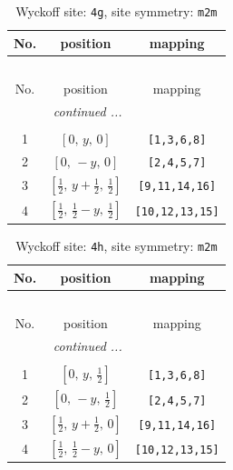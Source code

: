 \documentclass[fleqn,8pt]{jsarticle}
\begin{document}
\renewcommand{\arraystretch}{1.2}
\begin{longtable}{ccc}
\caption{Wyckoff site: {\tt 4g}, site symmetry: {\tt m2m}}
 \\
 \hline \hline
No. & position & mapping \\ \hline \endfirsthead

\multicolumn{2}{l}{\tablename\ \thetable{}} \\
 \hline \hline
No. & position & mapping \\ \hline \endhead

 \hline \hline
\multicolumn{2}{r}{\footnotesize\it continued ...} \\ \endfoot

 \hline \hline
\multicolumn{2}{r}{} \\ \endlastfoot

1 & $\left[ 0,\, y,\, 0 \right]$ & {\tt [1,3,6,8]} \\ \hline
2 & $\left[ 0,\, - y,\, 0 \right]$ & {\tt [2,4,5,7]} \\ \hline
3 & $\left[ \frac{1}{2},\, y + \frac{1}{2},\, \frac{1}{2} \right]$ & {\tt [9,11,14,16]} \\ \hline
4 & $\left[ \frac{1}{2},\, \frac{1}{2} - y,\, \frac{1}{2} \right]$ & {\tt [10,12,13,15]} \\
\end{longtable}
\renewcommand{\arraystretch}{1.2}
\begin{longtable}{ccc}
\caption{Wyckoff site: {\tt 4h}, site symmetry: {\tt m2m}}
 \\
 \hline \hline
No. & position & mapping \\ \hline \endfirsthead

\multicolumn{2}{l}{\tablename\ \thetable{}} \\
 \hline \hline
No. & position & mapping \\ \hline \endhead

 \hline \hline
\multicolumn{2}{r}{\footnotesize\it continued ...} \\ \endfoot

 \hline \hline
\multicolumn{2}{r}{} \\ \endlastfoot

1 & $\left[ 0,\, y,\, \frac{1}{2} \right]$ & {\tt [1,3,6,8]} \\ \hline
2 & $\left[ 0,\, - y,\, \frac{1}{2} \right]$ & {\tt [2,4,5,7]} \\ \hline
3 & $\left[ \frac{1}{2},\, y + \frac{1}{2},\, 0 \right]$ & {\tt [9,11,14,16]} \\ \hline
4 & $\left[ \frac{1}{2},\, \frac{1}{2} - y,\, 0 \right]$ & {\tt [10,12,13,15]} \\
\end{longtable}
\end{document}
